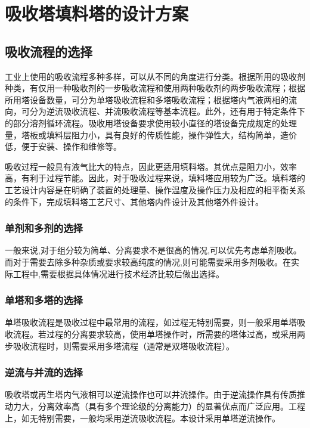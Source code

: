 \chapter{吸收塔填料塔的设计方案}



\section{吸收流程的选择}

工业上使用的吸收流程多种多样，可以从不同的角度进行分类。根据所用的吸收剂种类，有仅用一种吸收剂的一步吸收流程和使用两种吸收剂的两步吸收流程；根据所用塔设备数量，可分为单塔吸收流程和多塔吸收流程；根据塔内气液两相的流向，可分为逆流吸收流程、并流吸收流程等基本流程。此外，还有用于特定条件下的部分溶剂循环流程。吸收用塔设备要求使用较小直径的塔设备完成规定的处理量，塔板或填料层阻力小，具有良好的传质性能，操作弹性大，结构简单，造价低，便于安装、操作和维修等。

吸收过程一般具有液气比大的特点，因此更适用填料塔。其优点是阻力小，效率高，有利于过程节能。因此，对于吸收过程来说，填料塔应用较为广泛。填料塔的工艺设计内容是在明确了装置的处理量、操作温度及操作压力及相应的相平衡关系的条件下，完成填料塔工艺尺寸、其他塔内件设计及其他塔外件设计。

\subsection{单剂和多剂的选择}

一般来说,对于组分较为简单、分离要求不是很高的情况,可以优先考虑单剂吸收。而对于需要去除多种杂质或要求较高纯度的情况,则可能需要采用多剂吸收。在实际工程中,需要根据具体情况进行技术经济比较后做出选择。


\subsection{单塔和多塔的选择}

单塔吸收流程是吸收过程中最常用的流程，如过程无特别需要，则一般采用单塔吸收流程。若过程的分离要求较高，使用单塔操作时，所需要的塔体过高，或采用两步吸收流程时，则需要采用多塔流程（通常是双塔吸收流程）。

\subsection{逆流与并流的选择}

吸收塔或再生塔内气液相可以逆流操作也可以并流操作。由于逆流操作具有传质推动力大，分离效率高（具有多个理论级的分离能力）的显著优点而广泛应用。工程上，如无特别需要，一般均采用逆流吸收流程。本设计采用单塔逆流操作。



